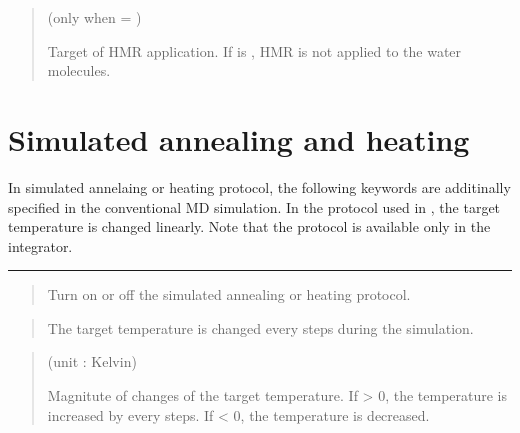 \documentclass[a4paper,11pt,oneside,english]{sphinxmanual}
\begin{document}
 
\begin{quote}

 (only when  = )

Target of HMR application. If  is , HMR is not applied to the water molecules.
\end{quote}


\section{Simulated annealing and heating}
\label{\detokenize{06_Dynamics:simulated-annealing-and-heating}}
In simulated annelaing or heating protocol, the following keywords
are additinally specified in the conventional MD simulation.
In the protocol used in , the target temperature is changed linearly.
Note that the protocol is available only in the  integrator.


\bigskip\hrule\bigskip


 
\begin{quote}


Turn on or off the simulated annealing or heating protocol.
\end{quote}

 
\begin{quote}


The target temperature is changed every  steps during the simulation.
\end{quote}

 
\begin{quote}

 (unit : Kelvin)

Magnitute of changes of the target temperature.
If  \textgreater{} 0, the temperature is increased by  every  steps.
If  \textless{} 0, the temperature is decreased.
\end{quote}
\end{document}
